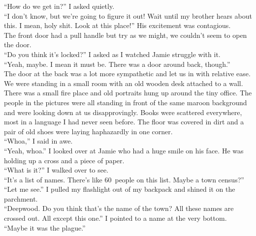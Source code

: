 \documentclass[a5paper]{scrartcl}
\begin{document}
\enquote{How do we get in?} I asked quietly.\\


\enquote{I don't know, but we're going to figure it out! Wait until my brother hears about this. I mean, holy shit. Look at this place!} His excitement was contagious.\\


The front door had a pull handle but try as we might, we couldn't seem to open the door. \\


\enquote{Do you think it's locked?} I asked as I watched Jamie struggle with it.\\


\enquote{Yeah, maybe. I mean it must be. There was a door around back, though.}\\


The door at the back was a lot more sympathetic and let us in with relative ease. We were standing in a small room with an old wooden desk attached to a wall. There was a small fire place and old portraits hung up around the tiny office. The people in the pictures were all standing in front of the same maroon background and were looking down at us disapprovingly. Books were scattered everywhere, most in a language I had never seen before. The floor was covered in dirt and a pair of old shoes were laying haphazardly in one corner.\\


\enquote{Whoa,} I said in awe.\\


\enquote{Yeah, whoa.} I looked over at Jamie who had a huge smile on his face. He was holding up a cross and a piece of paper.\\


\enquote{What is it?} I walked over to see.\\


\enquote{It's a list of names. There's like 60~people on this list. Maybe a town census?}\\


\enquote{Let me see.} I pulled my flashlight out of my backpack and shined it on the parchment. \\


\enquote{Deepwood. Do you think that's the name of the town? All these names are crossed out. All except this one.} I pointed to a name at the very bottom. \\


\enquote{Maybe it was the plague.}\\
\end{document}
